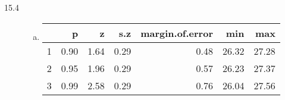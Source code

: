 \documentclass[landscape]{exam}
\begin{document}
\begin{description}
    \item[15.4] 
      \begin{enumerate}[(a)]
        \item

          \begin{table}[ht]
          \centering
          \begin{tabular}{rrrrrrr}
            \toprule
              & p    & z    & s.z  & margin.of.error & min   & max \\
            \midrule
            1 & 0.90 & 1.64 & 0.29 & 0.48            & 26.32 & 27.28 \\
            2 & 0.95 & 1.96 & 0.29 & 0.57            & 26.23 & 27.37 \\
            3 & 0.99 & 2.58 & 0.29 & 0.76            & 26.04 & 27.56 \\
            \bottomrule
          \end{tabular}
          \end{table}
      \end{enumerate}

  \end{description}
\end{document}
